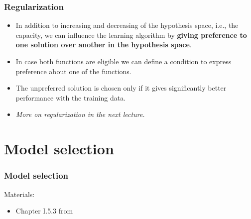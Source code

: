\documentclass[notes]{beamer}          %
\newif\iffull
\begin{document}
\iffull
\begin{frame}
\frametitle{The No Free Lunch theorem}
    \begin{itemize}
        \item {\bf No Free Lunch Theorem} for machine learning (Wolpert, 1996): \\
        Averaged over all possible data-generating distributions every classification algorithm has the same error rate when tested on new unobserved data.
        \item In some sense, no machine algorithm is universally better than any other algorithm.
        \item An interesting, but mainly theoretical result.
        \item In practice we often have an information about the probability distributions we deal with and can tailor our algorithms to perform well with particular distributions.
    \end{itemize}
\end{frame}
\fi 


\begin{frame}
\frametitle{Regularization}
    \begin{itemize}
        \item In addition to increasing and decreasing of the hypothesis space, i.e., the capacity, we can influence the learning algorithm by \textbf{giving preference to one solution over another in the hypothesis space}.
        \item In case both functions are eligible we can define a condition to express preference about one of the functions.
        \item The unpreferred solution is chosen only if it gives significantly better performance with the training data.
        \item \textit{More on regularization in the next lecture.}
    \end{itemize}
\end{frame}

\section{Model selection}

\begin{frame}
\frametitle{Model selection}
Materials:
\begin{itemize}
    \item Chapter I.5.3 from \cite{deeplearning}
\end{itemize}
\end{frame}
\end{document}
